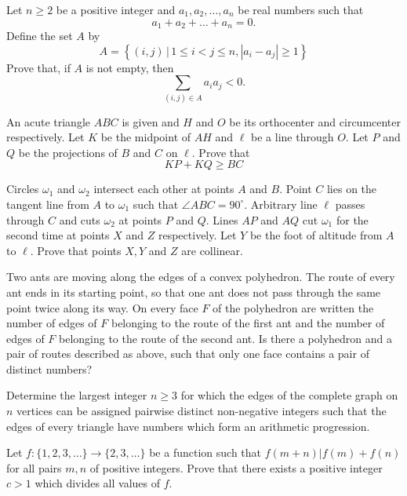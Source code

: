 \documentclass[11pt]{scrartcl}
\begin{document}
\begin{problem}[781756252908608]
Let $n\geqslant 2$ be a positive integer and $a_1,a_2, \ldots ,a_n$ be real numbers such that\[a_1+a_2+\dots+a_n=0.\]Define the set $A$ by
\[A=\left\{(i, j)\,|\,1 \leqslant i<j \leqslant n,\left|a_{i}-a_{j}\right| \geqslant 1\right\}\]Prove that, if $A$ is not empty, then
\[\sum_{(i, j) \in A} a_{i} a_{j}<0.\]
\end{problem}
\begin{problem}[1251781469282726042]
	An acute triangle $ABC$ is given and $H$ and $O$ be its orthocenter and circumcenter respectively. Let $K$ be the midpoint of $AH$ and $\ell$ be a line through $O. $ Let $P$ and $Q$ be the projections of $B$ and $C$ on $\ell. $ Prove that$$KP+KQ\ge BC$$
\end{problem}
\begin{problem}[4674406086325821196]
	Circles $\omega_1$ and $\omega_2$ intersect each other at points $A$ and $B$. Point $C$ lies on the tangent line from $A$ to $\omega_1$ such that
$\angle ABC = 90^\circ$. Arbitrary line $\ell$ passes through $C$ and cuts $\omega_2$ at points $P$ and $Q$. Lines $AP$ and $AQ$ cut $\omega_1$ for the second time at points $X$ and $Z$ respectively. Let $Y$ be the foot of altitude from $A$ to $\ell$. Prove that points $X, Y$ and $Z$ are collinear.
\end{problem}
\begin{problem}[602995508900984]
Two ants are moving along the edges of a convex polyhedron. The route of every ant ends in its starting point, so that one ant does not pass through the same point twice along its way. On every face $F$ of the polyhedron are written the number of edges of $F$ belonging to the route of the first ant and the number of edges of $F$ belonging to the route of the second ant. Is there a polyhedron and a pair of routes described as above, such that only one face contains a pair of distinct numbers?
\end{problem}
\begin{problem}[84404352934565744]
Determine the largest integer $n\geq 3$ for which the edges of the complete graph on $n$ vertices
can be assigned pairwise distinct non-negative integers such that the edges of every triangle have numbers which form an arithmetic progression.
\end{problem}
\begin{problem}[208441124738479]
Let $f : \{ 1, 2, 3, \dots \} \to \{ 2, 3, \dots \}$ be a function such that $f(m + n) | f(m) + f(n) $ for all pairs $m,n$ of positive integers. Prove that there exists a positive integer $c > 1$ which divides all values of $f$.
\end{problem}
\end{document}
